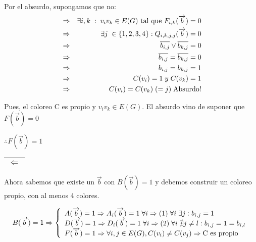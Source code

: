 \documentclass[12pt,a4paper]{report}
\newcounter{neq}
\begin{document}
		Por el absurdo, supongamos que no:
		\begin{eqnarray}
			\nonumber &\Rightarrow & \exists i, k \; : \; v_{i} v_{k} \in E(G) \textup{ tal que } F_{i, k}(\overrightarrow{b}) = 0 \\
			\nonumber &\Rightarrow & \exists j \; \in \lbrace 1, 2, 3, 4 \rbrace : Q_{i, k, j, j}(\overrightarrow{b}) = 0 \\
			\nonumber &\Rightarrow & \overline{b_{i, j}} \vee \overline{b_{k, j}} = 0 \\
			\nonumber &\Rightarrow & \overline{b_{i, j}} = \overline{b_{k, j}} = 0 \\
			\nonumber &\Rightarrow & b_{i, j} = b_{k, j} = 1 \\
			\nonumber &\Rightarrow & C(v_{i}) = 1\; y \; C(v_{k}) = 1\\
			\nonumber &\Rightarrow & C(v_{i}) = C(v_{k}) \; (= j) \; \textup{Absurdo!}
		\end{eqnarray}

		Pues, el coloreo C es propio y $v_{i} v_{k} \in E(G)$. El absurdo vino de suponer que $F(\overrightarrow{b}) = 0$

		\vspace{3mm}
		$\therefore F(\overrightarrow{b}) = 1$

		\vspace{5mm}
		\begin{tabular}{|c|} \hline $\Leftarrow$ \\ \hline \end{tabular}

		Ahora sabemos que existe un $\overrightarrow{b}$ con $B(\overrightarrow{b}) = 1$ y debemos construir un coloreo propio, con al menos 4 colores.

		\begin{equation*}
			B(\overrightarrow{b}) = 1\Rightarrow
  			\left \lbrace
  			\begin{array}{l}
    		 A(\overrightarrow{b}) = 1 \Rightarrow A_{i}(\overrightarrow{b}) = 1 \; \forall i \Rightarrow  (1) \; \forall i \; \exists j : b_{i, j}  = 1 \\
     		 D(\overrightarrow{b}) = 1 \Rightarrow D_{i}(\overrightarrow{b}) = 1 \; \forall i \Rightarrow  (2) \;  \forall i \; \nexists j \neq l : b_{i, j}  = 1 = b_{i, l} \\
     		 F(\overrightarrow{b}) = 1 \Rightarrow \forall i, j \in E(G), C(v_{i}) \neq C(v_{j}) \Rightarrow \textup{C es propio}
  			\end{array}
  			\right.
		\end{equation*}
\end{document}
